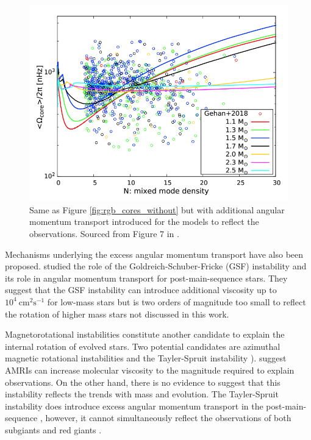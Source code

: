 \begin{figure}[h]
    \includegraphics[width=\textwidth]{Figures/intro_figures/rgb_core_rot.png}
    \caption[Average core rotation rates of red giants against mixed mode density without additional angular momentum transport]{Same as Figure \ref{fig:rgb_cores_without} but with additional angular momentum transport introduced for the models to reflect the observations.
    Sourced from Figure 7 in \citet{moyano_asteroseismology_2022}.}
    \label{fig:rgb_cores_with}
\end{figure}


Mechanisms underlying the excess angular momentum transport have also been proposed.
\citet{barker_angular_2019,barker_angular_2020} studied the role of the Goldreich-Schuber-Fricke (GSF) instability \citep{goldreich_differential_1967,fricke_rotation_1967} and its role in angular momentum transport for post-main-sequence stars.
They suggest that the GSF instability can introduce additional viscosity up to $10^4 \ \text{cm}^2 \text{s}^{-1}$ for low-mass stars but is two orders of magnitude too small to reflect the rotation of higher mass stars not discussed in this work.

Magnetorotational instabilities constitute another candidate to explain the internal rotation of evolved stars.
Two potential candidates are azimuthal magnetic rotational instabilities  and the Tayler-Spruit instability \citep[see ][]{spruit_dynamo_2002}).
\citet{rudiger_diffusive_2015} suggest AMRIs can increase molecular viscosity to the magnitude required to explain observations.
On the other hand, there is no evidence to suggest that this instability reflects the trends with mass and evolution.
The Tayler-Spruit instability does introduce excess angular momentum transport in the post-main-sequence \citep{fuller_slowing_2019}, however, it cannot simultaneously reflect the observations of both subgiants and red giants \citep{eggenberger_asteroseismology_2019,den_hartogh_constraining_2019}.

